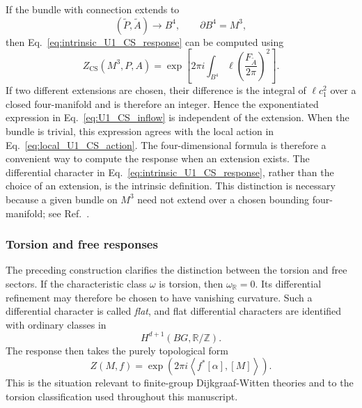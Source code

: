\documentclass[aps,prx,reprint,superscriptaddress,twocolumn,amsmath,amssymb,amsfonts, nofootinbib]{revtex4-2}
\theoremstyle{apsstyle}
\begin{document}
\bigskip 

If the bundle with connection extends to
\begin{equation*}
    (\widetilde P,\widetilde A)
    \longrightarrow
    B^4,
    \qquad
    \partial B^4=M^3,
\end{equation*}
then Eq.~\eqref{eq:intrinsic_U1_CS_response} can be computed using
\begin{equation}
    Z_{\mathrm{CS}}(M^3,P,A)
    =
    \exp\left[
        2\pi i
        \int_{B^4}
        \ell
        \left(
            \frac{F_{\widetilde A}}{2\pi}
        \right)^2
    \right].
    \label{eq:U1_CS_inflow}
\end{equation}
If two different extensions are chosen, their difference is the integral of $\ell c_1^2$ over a closed four-manifold and is therefore an integer. Hence the exponentiated expression in Eq.~\eqref{eq:U1_CS_inflow} is independent of the extension. When the bundle is trivial, this expression agrees with the local action in Eq.~\eqref{eq:local_U1_CS_action}. The four-dimensional formula is therefore a convenient way to compute the response when an extension exists. The differential character in Eq.~\eqref{eq:intrinsic_U1_CS_response}, rather than the choice of an extension, is the intrinsic definition. This distinction is necessary because a given bundle on $M^3$ need not extend over a chosen bounding four-manifold; see Ref.~\cite{Dijkgraaf1990}.

\subsubsection{Torsion and free responses}

The preceding construction clarifies the distinction between the torsion and free sectors. If the characteristic class $\omega$ is torsion, then $\omega_{\mathbb R}=0$. Its differential refinement may therefore be chosen to have vanishing curvature. Such a differential character is called \emph{flat}, and flat differential characters are identified with ordinary classes in
\begin{equation*}
    H^{d+1}(BG,\mathbb R/\mathbb Z).
\end{equation*}
The response then takes the purely topological form
\begin{equation*}
    Z(M,f)
    =
    \exp\left(
        2\pi i
        \left\langle
            f^*[\alpha],
            [M]
        \right\rangle
    \right).
\end{equation*}
This is the situation relevant to finite-group Dijkgraaf-Witten theories and to the torsion classification used throughout this manuscript.
\end{document}
